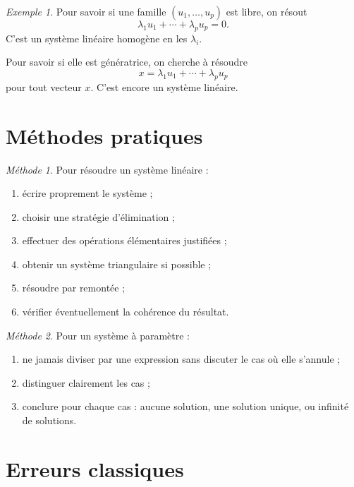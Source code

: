 \documentclass[11pt,a4paper]{article}
\theoremstyle{remark}
\newtheorem{exemple}[definition]{Exemple}
\newtheorem*{methode}{Méthode}
\begin{document}
\begin{exemple}
Pour savoir si une famille \((u_1,\dots,u_p)\) est libre, on résout
\[
\lambda_1u_1+\cdots+\lambda_pu_p=0.
\]
C’est un système linéaire homogène en les \(\lambda_i\).

Pour savoir si elle est génératrice, on cherche à résoudre
\[
x=\lambda_1u_1+\cdots+\lambda_pu_p
\]
pour tout vecteur \(x\). C’est encore un système linéaire.
\end{exemple}

\section{Méthodes pratiques}

\begin{methode}
Pour résoudre un système linéaire :
\begin{enumerate}
    \item écrire proprement le système ;
    \item choisir une stratégie d’élimination ;
    \item effectuer des opérations élémentaires justifiées ;
    \item obtenir un système triangulaire si possible ;
    \item résoudre par remontée ;
    \item vérifier éventuellement la cohérence du résultat.
\end{enumerate}
\end{methode}

\begin{methode}
Pour un système à paramètre :
\begin{enumerate}
    \item ne jamais diviser par une expression sans discuter le cas où elle s’annule ;
    \item distinguer clairement les cas ;
    \item conclure pour chaque cas : aucune solution, une solution unique, ou infinité de solutions.
\end{enumerate}
\end{methode}

\section{Erreurs classiques}
\end{document}

